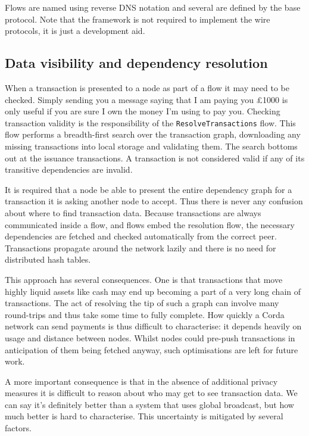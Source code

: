 \documentclass{article}
\begin{document}
Flows are named using reverse DNS notation and several are defined by the base protocol. Note that the framework is
not required to implement the wire protocols, it is just a development aid.

\subsection{Data visibility and dependency resolution}

When a transaction is presented to a node as part of a flow it may need to be checked. Simply sending you
a message saying that I am paying you \pounds1000 is only useful if you are sure I own the money I'm using to pay you.
Checking transaction validity is the responsibility of the \texttt{ResolveTransactions} flow. This flow performs
a breadth-first search over the transaction graph, downloading any missing transactions into local storage and
validating them. The search bottoms out at the issuance transactions. A transaction is not considered valid if
any of its transitive dependencies are invalid.

It is required that a node be able to present the entire dependency graph for a transaction it is asking another
node to accept. Thus there is never any confusion about where to find transaction data. Because transactions are
always communicated inside a flow, and flows embed the resolution flow, the necessary dependencies are fetched
and checked automatically from the correct peer. Transactions propagate around the network lazily and there is
no need for distributed hash tables.

This approach has several consequences. One is that transactions that move highly liquid assets like cash may
end up becoming a part of a very long chain of transactions. The act of resolving the tip of such a graph can
involve many round-trips and thus take some time to fully complete. How quickly a Corda network can send payments
is thus difficult to characterise: it depends heavily on usage and distance between nodes. Whilst nodes could
pre-push transactions in anticipation of them being fetched anyway, such optimisations are left for future work.

A more important consequence is that in the absence of additional privacy measures it is difficult to reason
about who may get to see transaction data. We can say it's definitely better than a system that uses global
broadcast, but how much better is hard to characterise. This uncertainty is mitigated by several factors.
\end{document}
